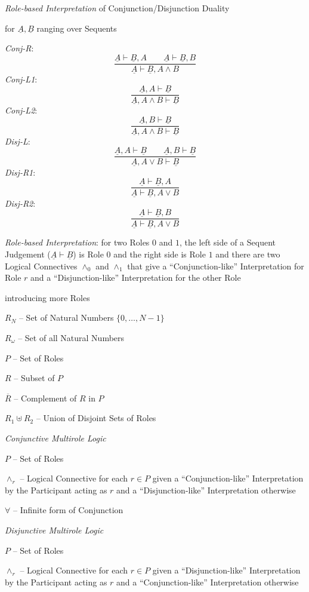 \emph{Role-based Interpretation} of Conjunction/Disjunction Duality

for $\underline{A},\underline{B}$ ranging over Sequents

\emph{Conj-R}:
\[
  \frac {\underline{A} \vdash \underline{B},A \quad\quad
    \underline{A} \vdash \underline{B},B}
  {\underline{A} \vdash \underline{B},A \wedge B}
\]
\emph{Conj-L1}:
\[
  \frac {\underline{A},A \vdash \underline{B}}
  {\underline{A},A \wedge B \vdash \underline{B}}
\]
\emph{Conj-L2}:
\[
  \frac {\underline{A},B \vdash \underline{B}}
  {\underline{A},A \wedge B \vdash \underline{B}}
\]
\emph{Disj-L}:
\[
  \frac {\underline{A},A \vdash \underline{B} \quad\quad
    \underline{A},B \vdash \underline{B}}
  {\underline{A},A \vee B \vdash \underline{B}}
\]
\emph{Disj-R1}:
\[
  \frac {\underline{A} \vdash \underline{B},A}
  {\underline{A} \vdash \underline{B}, A \vee B}
\]
\emph{Disj-R2}:
\[
  \frac {\underline{A} \vdash \underline{B},B}
  {\underline{A} \vdash \underline{B}, A \vee B}
\]

\emph{Role-based Interpretation}: for two Roles $0$ and $1$, the left
side of a Sequent Judgement ($\underline{A} \vdash \underline{B}$) is
Role $0$ and the right side is Role $1$ and there are two Logical
Connectives $\wedge_0$ and $\wedge_1$ that give a ``Conjunction-like''
Interpretation for Role $r$ and a ``Disjunction-like'' Interpretation
for the other Role

introducing more Roles

$R_N$ -- Set of Natural Numbers $\{0,\ldots,N-1\}$

$R_\omega$ -- Set of all Natural Numbers

$P$ -- Set of Roles

$R$ -- Subset of $P$

$\overline{R}$ -- Complement of $R$ in $P$

$R_1 \uplus R_2$ -- Union of Disjoint Sets of Roles


\emph{Conjunctive Multirole Logic}

$P$ -- Set of Roles

$\wedge_r$ -- Logical Connective for each $r \in P$ given a
``Conjunction-like'' Interpretation by the Participant acting as $r$
and a ``Disjunction-like'' Interpretation otherwise

$\forall$ -- Infinite form of Conjunction


\emph{Disjunctive Multirole Logic}

$P$ -- Set of Roles

$\wedge_r$ -- Logical Connective for each $r \in P$ given a
``Disjunction-like'' Interpretation by the Participant acting as $r$
and a ``Conjunction-like'' Interpretation otherwise


